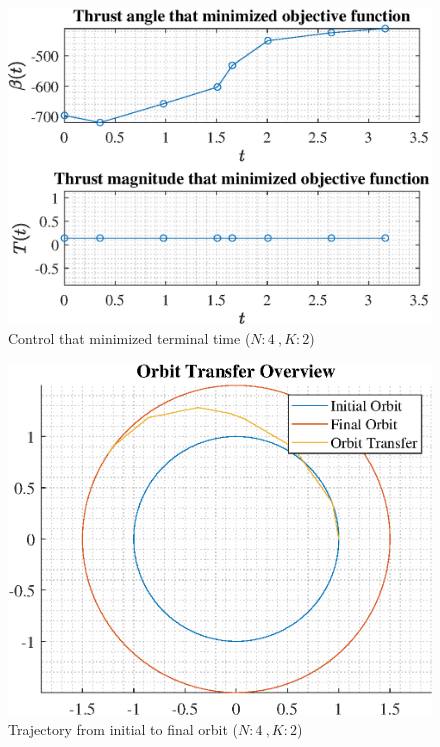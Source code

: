 \documentclass[]{article}
\begin{document}
\begin{figure}
	\centering
	\includegraphics[scale=0.75]{control_N4_K2_C2_tf.eps}
	\caption{Control that minimized terminal time (\(N:4\ , K:2\))}
	\label{fig:control_N4_K2_C2_tf}
\end{figure}
\begin{figure}
	\centering
	\includegraphics[scale=0.75]{orbit_N4_K2_C2_tf.eps}
	\caption{Trajectory from initial to final orbit (\(N:4\ , K:2\))}
	\label{fig:orbit_N4_K2_C2_tf}
\end{figure}
\end{document}
